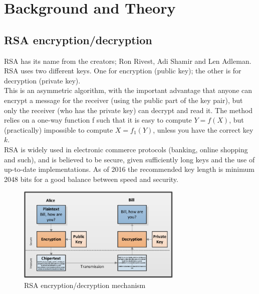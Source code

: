 \chapter{Background and Theory}


\section{RSA encryption/decryption}
RSA has its name from the creators; Ron Rivest, Adi Shamir and Len Adleman. RSA uses two different keys. One for encryption (public key); the other is for decryption (private key). \\
This is an asymmetric algorithm, with the important advantage that anyone can encrypt a message for the receiver (using the public part of the key pair), but only the receiver (who has the private key) can decrypt and read it. The method relies on a one-way function f such that it is easy to compute $Y=f(X)$, but (practically) impossible to compute $X=f_1(Y)$, unless you have the correct key $k$.
\\
RSA is widely used in electronic commerce protocols (banking, online shopping and such), and is believed to be secure, given sufficiently long keys and the use of up-to-date implementations. As of 2016 the recommended key length is minimum 2048 bits for a good balance between speed and security.

\begin{figure}[H]
\centering
\includegraphics[width=0.7\textwidth]{images/rsa.PNG}
\caption{RSA encryption/decryption mechanism}
\label{fig:rsa}
\end{figure}

